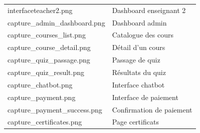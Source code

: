 \begin{table}[H]
\begin{tabularx}{\textwidth}{>{\ttfamily}l X}
interfaceteacher2.png & Dashboard enseignant 2 \\
capture\_admin\_dashboard.png & Dashboard admin \\
capture\_courses\_list.png & Catalogue des cours \\
capture\_course\_detail.png & Détail d’un cours \\
capture\_quiz\_passage.png & Passage de quiz \\
capture\_quiz\_result.png & Résultats du quiz \\
capture\_chatbot.png & Interface chatbot \\
capture\_payment.png & Interface de paiement \\
capture\_payment\_success.png & Confirmation de paiement \\
capture\_certificates.png & Page certificats \\

\bottomrule
\end{tabularx}
\end{table}


